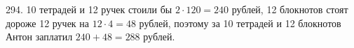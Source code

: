 294. 10 тетрадей и 12 ручек стоили бы $2\cdot120=240$ рублей, 12 блокнотов стоят дороже 12 ручек на $12\cdot4=48$ рублей, поэтому за 10 тетрадей и 12 блокнотов Антон заплатил $240+48=288$ рублей.\\
